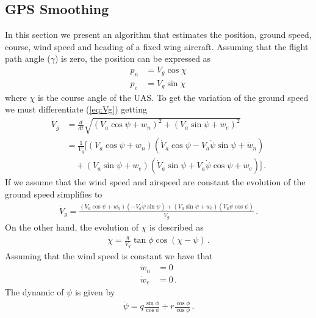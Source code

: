 \subsection{GPS Smoothing}
In this section we present an algorithm that estimates the position, ground speed, course, wind speed and heading of a fixed wing aircraft. Assuming that the flight path angle ($\gamma$) is zero, the position can be expressed as
\begin{align*}
p_n&=V_g\cos\chi\\
p_e&=V_g\sin\chi\,
\end{align*}
where $\chi$ is the course angle of the UAS.
To get the variation of the ground speed we must differentiate (\ref{eq:Vg}) getting
\begin{align*}
\dot{V}_g &= \frac{d}{dt}\sqrt{(V_a\cos\psi+w_n)^2+(V_a\sin\psi+w_e)^2} \\
		  &= \frac{1}{V_g}[(V_a\cos\psi+w_n)(\dot{V}_a\cos\psi-V_a\dot{\psi}\sin\psi+\dot{w}_n)\\
		  & \quad +(V_a\sin\psi+w_e)(\dot{V}_a\sin\psi+V_a\dot{\psi}\cos\psi+\dot{w}_e)]\,.
\end{align*}
If we assume that the wind speed and airspeed are constant the evolution of the ground speed simplifies to
\begin{align*}
\dot{V}_g=\frac{(V_a\cos\psi+w_n)(-V_a\dot{\psi}\sin\psi)+(V_a\sin\psi+w_e)(V_a\dot{\psi}\cos\psi)}{V_g}\,.
\end{align*}
On the other hand, the evolution of $\chi$ is described as
\begin{align*}
\dot{\chi}=\frac{g}{V_g}\tan\phi\cos(\chi-\psi)\,.
\end{align*}
Assuming that the wind speed is constant we have that
\begin{align*}
\dot{w}_n&=0 \\
\dot{w}_e&=0\,.
\end{align*}
The dynamic of $\psi$ is given by
\begin{align*}
\dot{\psi}=q\frac{\sin\phi}{\cos\phi}+r\frac{\cos\phi}{\cos\phi}\,.
\end{align*}


